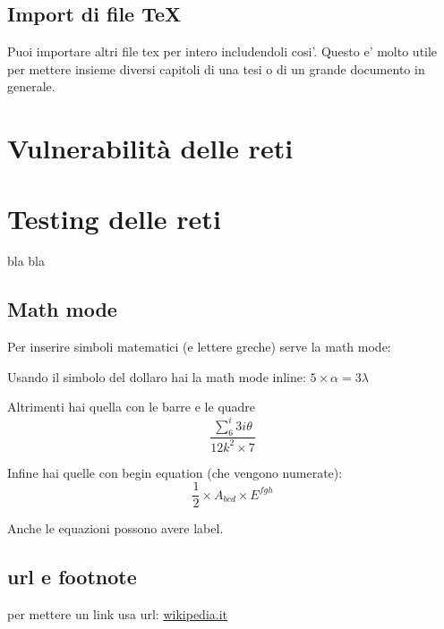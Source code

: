\documentclass[12pt,a4paper,twoside]{book}
\begin{document}

\section{Import di file TeX}
Puoi importare altri file tex per intero includendoli cosi'.
Questo e' molto utile per mettere insieme diversi capitoli di una tesi o di un grande documento in generale.



\chapter{Vulnerabilità delle reti}

\chapter{Testing delle reti}
bla bla
\section{Math mode}
Per inserire simboli matematici (e lettere greche) serve la math mode:

Usando il simbolo del dollaro hai la math mode inline: $5 \times \alpha = 3\lambda$

Altrimenti hai quella con le barre e le quadre \[ \frac{\sum_6^i 3i\theta}{12k^2\times 7}\]

Infine hai quelle con begin equation (che vengono numerate):
\begin{equation}
    \frac{1}{2}\times A_{bcd}\times E^{fgh}
\end{equation}

Anche le equazioni possono avere label.
\section{url e footnote}
per mettere un link usa url: \url{wikipedia.it}
\end{document}
